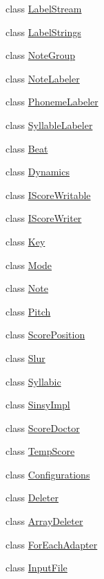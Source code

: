 \begin{DoxyCompactItemize}
class \hyperlink{classsinsy_1_1LabelStream}{\-Label\-Stream}
\item 
class \hyperlink{classsinsy_1_1LabelStrings}{\-Label\-Strings}
\item 
class \hyperlink{classsinsy_1_1NoteGroup}{\-Note\-Group}
\item 
class \hyperlink{classsinsy_1_1NoteLabeler}{\-Note\-Labeler}
\item 
class \hyperlink{classsinsy_1_1PhonemeLabeler}{\-Phoneme\-Labeler}
\item 
class \hyperlink{classsinsy_1_1SyllableLabeler}{\-Syllable\-Labeler}
\item 
class \hyperlink{classsinsy_1_1Beat}{\-Beat}
\item 
class \hyperlink{classsinsy_1_1Dynamics}{\-Dynamics}
\item 
class \hyperlink{classsinsy_1_1IScoreWritable}{\-I\-Score\-Writable}
\item 
class \hyperlink{classsinsy_1_1IScoreWriter}{\-I\-Score\-Writer}
\item 
class \hyperlink{classsinsy_1_1Key}{\-Key}
\item 
class \hyperlink{classsinsy_1_1Mode}{\-Mode}
\item 
class \hyperlink{classsinsy_1_1Note}{\-Note}
\item 
class \hyperlink{classsinsy_1_1Pitch}{\-Pitch}
\item 
class \hyperlink{classsinsy_1_1ScorePosition}{\-Score\-Position}
\item 
class \hyperlink{classsinsy_1_1Slur}{\-Slur}
\item 
class \hyperlink{classsinsy_1_1Syllabic}{\-Syllabic}
\item 
class \hyperlink{classsinsy_1_1SinsyImpl}{\-Sinsy\-Impl}
\item 
class \hyperlink{classsinsy_1_1ScoreDoctor}{\-Score\-Doctor}
\item 
class \hyperlink{classsinsy_1_1TempScore}{\-Temp\-Score}
\item 
class \hyperlink{classsinsy_1_1Configurations}{\-Configurations}
\item 
class \hyperlink{classsinsy_1_1Deleter}{\-Deleter}
\item 
class \hyperlink{classsinsy_1_1ArrayDeleter}{\-Array\-Deleter}
\item 
class \hyperlink{classsinsy_1_1ForEachAdapter}{\-For\-Each\-Adapter}
\item 
class \hyperlink{classsinsy_1_1InputFile}{\-Input\-File}
\item 

\end{DoxyCompactItemize}
